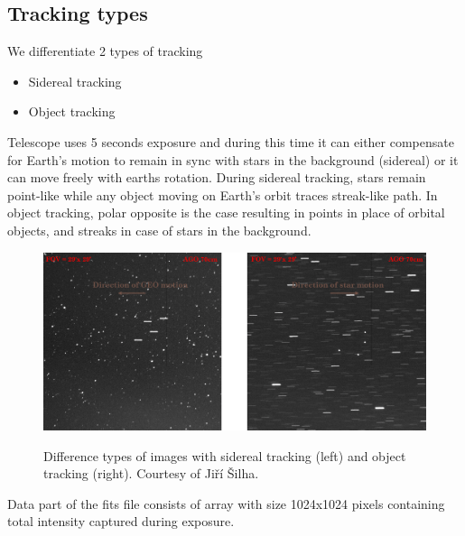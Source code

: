 \documentclass[12pt, a4paper, oneside]{book}
\begin{document}
\subsection{Tracking types}
We differentiate 2 types of tracking
\begin{itemize}
    \item{Sidereal tracking}
    \item{Object tracking}
\end{itemize}

Telescope uses 5 seconds exposure and during this time it can either compensate for Earth's motion to remain in sync with stars in the background (sidereal) or it can move freely with earths rotation.
During sidereal tracking, stars remain point-like while any object moving on Earth's orbit traces streak-like path.
In object tracking, polar opposite is the case resulting in points in place of orbital objects, and streaks in case of stars in the background.

\begin{figure}[H]
    \begin{center}
        \includegraphics[scale=0.60]{images/tracking.png}
        \label{img:tracking types}
        \caption{Difference types of images with sidereal tracking (left) and object tracking (right). Courtesy of Jiří Šilha.}
    \end{center}
\end{figure}

Data part of the fits file consists of array with size 1024x1024 pixels containing total intensity captured during exposure.
\end{document}

